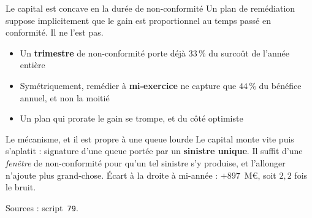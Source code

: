 \documentclass[11pt]{beamer}
\begin{document}
\begin{frame}{Le capital est concave en la durée de non-conformité}
\small
Un plan de remédiation suppose implicitement que le gain est proportionnel au temps passé en
conformité. Il ne l'est pas.
\vspace{3mm}

\begin{itemize}\itemsep6pt
  \item Un \textbf{trimestre} de non-conformité porte déjà $33\,\%$ du surcoût de l'année
        entière
  \item Symétriquement, remédier à \textbf{mi-exercice} ne capture que $44\,\%$ du bénéfice
        annuel, et non la moitié
  \item \alert{Un plan qui prorate le gain se trompe, et du côté optimiste}
\end{itemize}
\vspace{5mm}
\begin{block}{Le mécanisme, et il est propre à une queue lourde}
Le capital monte vite puis s'aplatit : signature d'une queue portée par un \textbf{sinistre
unique}. Il suffit d'une \emph{fenêtre} de non-conformité pour qu'un tel sinistre s'y produise,
et l'allonger n'ajoute plus grand-chose. Écart à la droite à mi-année : $+897$~M\euro, soit
$2{,}2$ fois le bruit.
\end{block}
\vspace{2mm}
{\scriptsize Sources : script~\texttt{79}.}
\end{frame}
\end{document}

